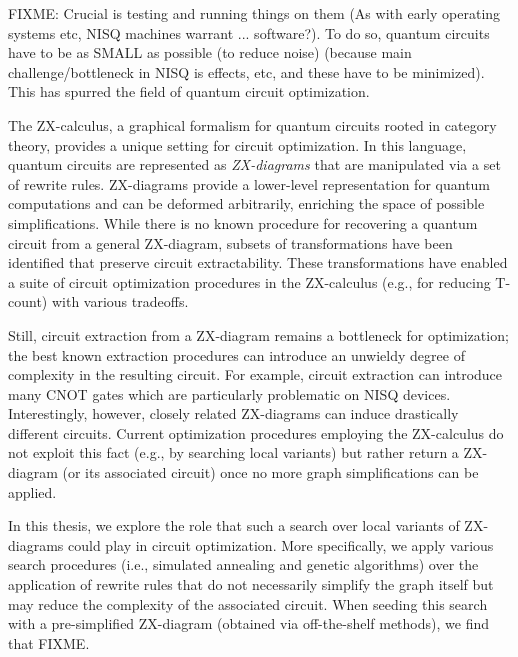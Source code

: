 FIXME: Crucial is testing and running things on them (As with early operating systems etc, NISQ machines warrant ... software?). To do so, quantum circuits have to be as SMALL as possible (to reduce noise) (because main challenge/bottleneck in NISQ is effects, etc, and these have to be minimized). This has spurred the field of quantum circuit optimization.
\fi


The ZX-calculus, a graphical formalism for quantum circuits rooted in category theory, provides a unique setting for circuit optimization.
In this language, quantum circuits are represented as \emph{ZX-diagrams} that are manipulated via a set of rewrite rules.
ZX-diagrams provide a lower-level representation for quantum computations and can be deformed arbitrarily, enriching the space of possible simplifications.
While there is no known procedure for recovering a quantum circuit from a general ZX-diagram, subsets of transformations have been identified that preserve circuit extractability.
These transformations have enabled a suite of circuit optimization procedures in the ZX-calculus (e.g., for reducing T-count) with various tradeoffs.

Still, circuit extraction from a ZX-diagram remains a bottleneck for optimization;
the best known extraction procedures can introduce an unwieldy degree of complexity in the resulting circuit.
For example, circuit extraction can introduce many CNOT gates which are particularly problematic on NISQ devices.
Interestingly, however, closely related ZX-diagrams can induce drastically different circuits.
Current optimization procedures employing the ZX-calculus do not exploit this fact (e.g., by searching local variants) but rather return a ZX-diagram (or its associated circuit) once no more graph simplifications can be applied.

In this thesis, we explore the role that such a search over local variants of ZX-diagrams could play in circuit optimization.
More specifically, we apply various search procedures (i.e., simulated annealing and genetic algorithms) over the application of rewrite rules that do not necessarily simplify the graph itself but may reduce the complexity of the associated circuit.
When seeding this search with a pre-simplified ZX-diagram (obtained via off-the-shelf methods), we find that FIXME. %

